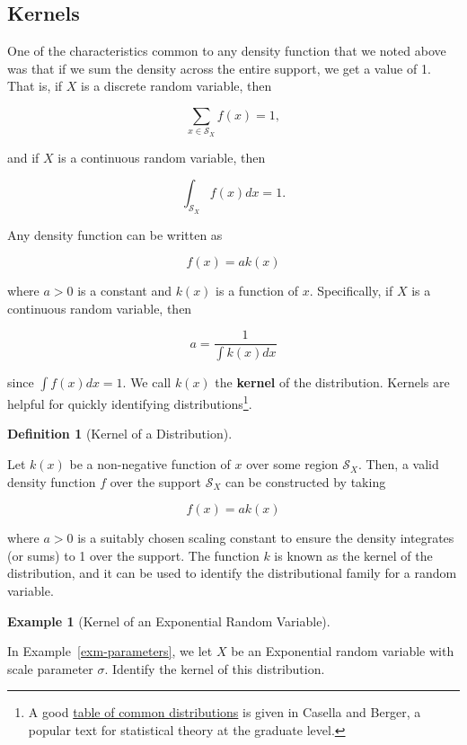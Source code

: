 \documentclass[
  letterpaper,
  DIV=11,
  numbers=noendperiod]{scrreprt}
\theoremstyle{definition}
\newtheorem{example}{Example}[chapter]
\theoremstyle{definition}
\newtheorem{definition}{Definition}[chapter]
\theoremstyle{plain}
\theoremstyle{remark}
\begin{document}
\hypertarget{kernels}{%
\subsection{Kernels}\label{kernels}}

One of the characteristics common to any density function that we noted
above was that if we sum the density across the entire support, we get a
value of 1. That is, if \(X\) is a discrete random variable, then

\[\sum_{x \in \mathcal{S}_X} f(x) = 1,\]

and if \(X\) is a continuous random variable, then

\[\int_{\mathcal{S}_X} f(x) dx = 1.\]

Any density function can be written as

\[f(x) = a k(x)\]

where \(a > 0\) is a constant and \(k(x)\) is a function of \(x\).
Specifically, if \(X\) is a continuous random variable, then

\[a = \frac{1}{\int k(x) dx}\]

since \(\int f(x) dx = 1\). We call \(k(x)\) the \textbf{kernel} of the
distribution. Kernels are helpful for quickly identifying
distributions\footnote{A good
  \href{https://qiangbo-workspace.oss-cn-shanghai.aliyuncs.com/2018-11-11-common-probability-distributions/distab.pdf}{table
  of common distributions} is given in Casella and Berger, a popular
  text for statistical theory at the graduate level.}.

\begin{definition}[Kernel of a
Distribution]\protect\hypertarget{def-kernel}{}\label{def-kernel}

Let \(k(x)\) be a non-negative function of \(x\) over some region
\(\mathcal{S}_X\). Then, a valid density function \(f\) over the support
\(\mathcal{S}_X\) can be constructed by taking

\[f(x) = a k(x)\]

where \(a > 0\) is a suitably chosen scaling constant to ensure the
density integrates (or sums) to 1 over the support. The function \(k\)
is known as the kernel of the distribution, and it can be used to
identify the distributional family for a random variable.

\end{definition}

\begin{example}[Kernel of an Exponential Random
Variable]\protect\hypertarget{exm-kernel}{}\label{exm-kernel}

In Example~\ref{exm-parameters}, we let \(X\) be an Exponential random
variable with scale parameter \(\sigma\). Identify the kernel of this
distribution.

\end{example}
\end{document}
